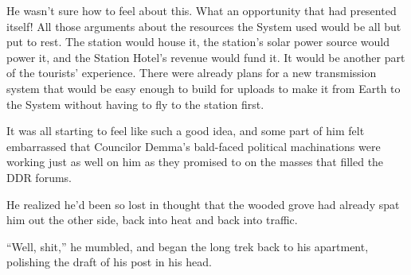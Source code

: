 He wasn't sure how to feel about this. What an opportunity that had presented itself! All those arguments about the resources the System used would be all but put to rest. The station would house it, the station's solar power source would power it, and the Station Hotel's revenue would fund it. It would be another part of the tourists' experience. There were already plans for a new transmission system that would be easy enough to build for uploads to make it from Earth to the System without having to fly to the station first.

It was all starting to feel like such a good idea, and some part of him felt embarrassed that Councilor Demma's bald-faced political machinations were working just as well on him as they promised to on the masses that filled the DDR forums.

He realized he'd been so lost in thought that the wooded grove had already spat him out the other side, back into heat and back into traffic.

``Well, shit,'' he mumbled, and began the long trek back to his apartment, polishing the draft of his post in his head.

